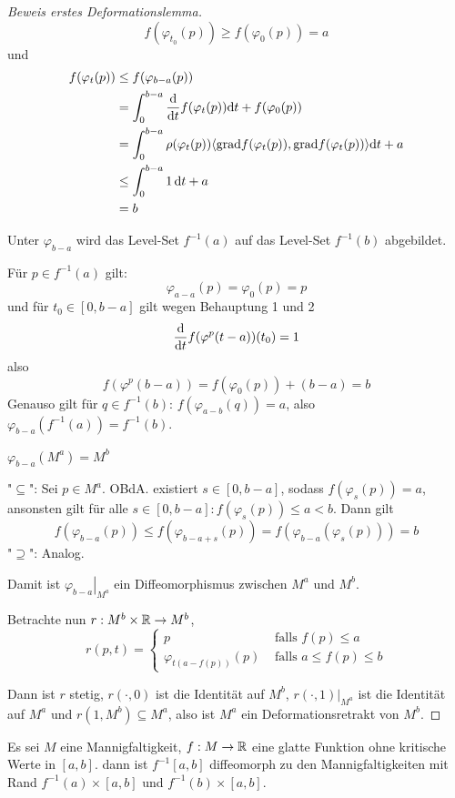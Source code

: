 \begin{proof}[Beweis erstes Deformationslemma]
    \[ f(\varphi_{t_0}(p)) \geq f(\varphi_0(p)) = a \]
    und
    \begin{align*}
        f(\varphi_t(p)) 
        & \leq f(\varphi_{b-a}(p)) \\
        & = \int_0^{b-a}{ \frac{{ \operatorname{d} } }{{ \operatorname{d} } t} } f(\varphi_t(p)) { \operatorname{d} } t + f(\varphi_0(p)) \\
        & = \int_0^{b-a}\rho(\varphi_t(p)) \langle { \operatorname{grad} } f (\varphi_t(p)), { \operatorname{grad} } f (\varphi_t(p)) \rangle { \operatorname{d} } t + a \\
        & \leq \int_0^{b-a} 1 \, { \operatorname{d} } t + a \\
        & = b
    \end{align*}
    \sectiondone

     Unter $\varphi_{b-a}$ wird das Level-Set 
    $f^{-1}(a)$ auf das Level-Set $f^{-1}(b)$ abgebildet.
     
    Für $p \in f^{-1}(a)$ gilt:
    \[ \varphi_{a-a}(p) = \varphi_0(p) = p \]
    und für $t_0 \in [0, b - a]$ gilt wegen Behauptung 1 und 2
    \[ { \frac{{ \operatorname{d} } }{{ \operatorname{d} } t} }f(\varphi^p(t-a)) (t_0) = 1 \]
    also
    \[ f(\varphi^p(b-a)) = f(\varphi_{0}(p)) + (b - a) = b \]
    Genauso gilt für $q \in f^{-1}(b)$: $f(\varphi_{a - b}(q)) = a$, also 
    $\varphi_{b - a}(f^{-1}(a)) = f^{-1}(b)$.
    \sectiondone

     $\varphi_{b - a} (M^a) = M^b$

    "$\subseteq$": Sei $p \in M^a$. OBdA. existiert $s \in [0, b-a]$, sodass 
    $f(\varphi_s(p)) = a$, ansonsten gilt für alle 
    $s \in [0, b-a]: f(\varphi_s(p)) \leq a < b$. Dann gilt
    \[ f(\varphi_{b-a}(p)) \leq f(\varphi_{b-a+s}(p)) = f(\varphi_{b-a}(\varphi_s(p))) = b \] 
    "$\supseteq$": Analog.
    \sectiondone

    Damit ist $\left. \varphi_{b-a} \right\vert_{M^a}$ ein Diffeomorphismus zwischen
    $M^a$ und $M^b$. 

    Betrachte nun $r: M^b \times { \mathbb R } \to M^b$,
    \[  
        r(p, t) = \begin{cases}
            p & \text{ falls } f(p) \leq a \\
            \varphi_{t(a - f(p))}(p) & \text{ falls } a \leq f(p) \leq b 
        \end{cases}
    \]

    Dann ist $r$ stetig, $r(\cdot, 0)$ ist die Identität auf $M^b$, 
    $r(\cdot, 1)|_{M^a}$ ist die Identität auf $M^a$ und 
    $r(1, M^b) \subseteq M^a$, also ist $M^a$ ein Deformationsretrakt von $M^b$.

\end{proof}

\begin{corollary}
    Es sei $M$ eine Mannigfaltigkeit, $f: M \to { \mathbb R }$ eine glatte Funktion ohne
    kritische Werte in $[a, b]$. dann ist $f^{-1}[a, b]$ diffeomorph zu den
    Mannigfaltigkeiten mit Rand $f^{-1}(a) \times [a, b]$ und 
    $f^{-1}(b) \times [a, b]$.
\end{corollary}
